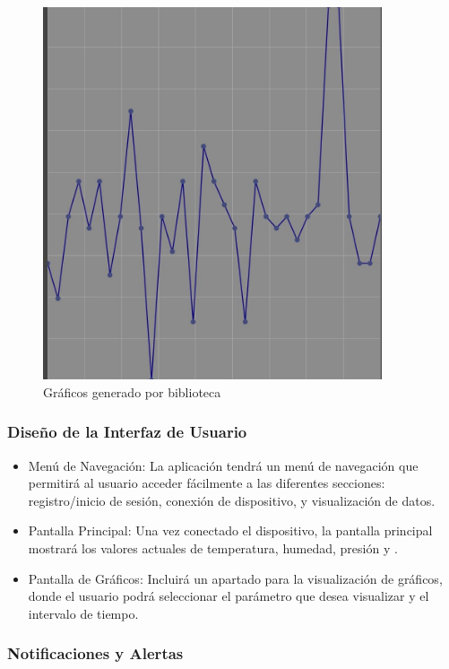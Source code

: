 \documentclass[../main]{subfiles}
\begin{document}
\begin{figure}[H]
	\centering
	\includegraphics[width=10cm]{res/GráficosParaAplicación.jpeg}
	\caption{Gráficos generado por biblioteca}
	\label{FiguraDeGráficos}
\end{figure}

\subsubsection{ Diseño de la Interfaz de Usuario}

\begin{itemize}
	\item Menú de Navegación:
	      La aplicación tendrá un menú de navegación que permitirá al usuario
	      acceder fácilmente a las diferentes secciones: registro/inicio de
	      sesión, conexión de dispositivo, y visualización de datos.
	\item Pantalla Principal:
	      Una vez conectado el dispositivo, la pantalla principal mostrará
	      los valores actuales de temperatura, humedad, presión y .
	\item Pantalla de Gráficos:
	      Incluirá un apartado para la visualización de gráficos, donde el usuario
	      podrá seleccionar el parámetro que desea visualizar y el intervalo de
	      tiempo.
\end{itemize}

\subsubsection{Notificaciones y Alertas}
\end{document}
